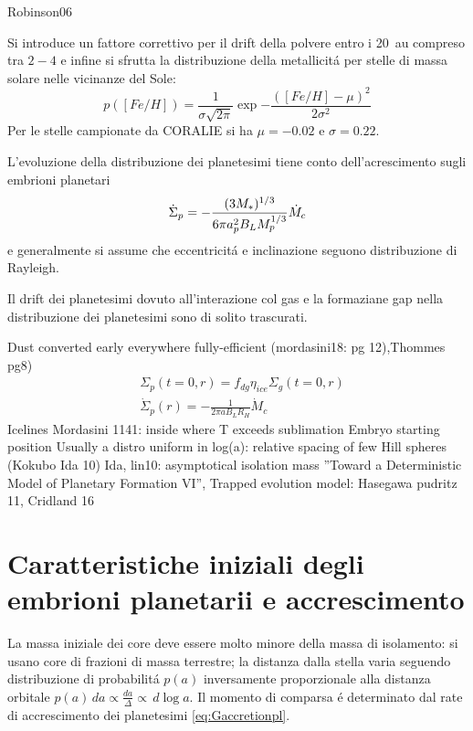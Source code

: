 \begin{workout}
Robinson06
\end{workout}

Si introduce un fattore correttivo per il drift della polvere entro i \SI{20}{\astronomicalunit} compreso tra $2-4$ e infine si sfrutta la distribuzione della metallicit\'a per stelle di massa solare nelle vicinanze del Sole:
\begin{equation}
p([Fe/H])=\frac{1}{\sigma\sqrt{2\pi}}\exp{-\frac{([Fe/H]-\mu)^2}{2\sigma^2}}
\end{equation}
Per le stelle campionate da CORALIE si ha $\mu=-0.02$ e $\sigma=0.22$.

L'evoluzione della distribuzione dei planetesimi tiene conto dell'acrescimento sugli embrioni planetari
\begin{equation}\dot{\Sigma}_p=-\frac{(3M_*)^{1/3}}{6\pi a_p^2B_LM_p^{1/3}}\dot{M}_c\end{equation}
e generalmente si assume che eccentricit\'a e inclinazione seguono distribuzione di Rayleigh.

Il drift dei planetesimi dovuto all'interazione col gas e la formaziane gap nella distribuzione dei planetesimi sono di solito trascurati.

\begin{workout}
Dust converted early everywhere fully-efficient (mordasini18: pg 12),Thommes pg8)
\begin{align*}
&\Sigma_p(t=0,r)=f_{dg}\eta_{ice}\Sigma_g(t=0,r)\\
&\dot{\Sigma}_p(r)=-\frac{1}{2\pi aB_LR_H}\dot{M}_c
\end{align*}
Icelines Mordasini 1141: inside where T exceeds sublimation
{Embryo starting position}
Usually a distro uniform in log(a): relative spacing of few Hill spheres (Kokubo Ida 10)
Ida, lin10: asymptotical isolation mass ''Toward a Deterministic Model of Planetary Formation VI'',
Trapped evolution model: Hasegawa pudritz 11, Cridland 16
\end{workout}

\section{Caratteristiche iniziali degli embrioni planetarii e accrescimento}

La massa iniziale dei core deve essere molto minore della massa di isolamento: si usano core di frazioni di massa terrestre; la distanza dalla stella varia seguendo distribuzione di probabilit\'a $p(a)$ inversamente proporzionale alla distanza orbitale $p(a)\,da\propto\frac{da}{\Delta}\propto\,d\log{a}$. Il momento di comparsa \'e determinato dal rate di accrescimento dei planetesimi \eqref{eq:Gaccretionpl}.

